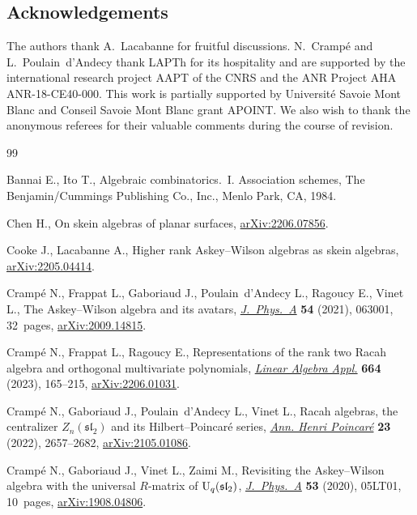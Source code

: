 \documentclass[pdftex]{sigma}
\numberwithin{equation}{section}
\theoremstyle{definition}
\begin{document}
\subsection*{Acknowledgements} The authors thank A.~Lacabanne for fruitful discussions.
N.~Cramp\'e and L.~Poulain~d'Andecy thank LAPTh for its hospitality and are supported by the international research project AAPT of the CNRS and the ANR Project AHA ANR-18-CE40-000.
This work is partially supported by Universit\'e Savoie Mont Blanc and Conseil Savoie Mont Blanc grant APOINT.
We also wish to thank the anonymous referees for their valuable comments during the course of revision.



\begin{thebibliography}{99}
\footnotesize\itemsep=0pt

Bannai E., Ito T., Algebraic combinatorics.~{I}. Association schemes, The
 Benjamin/Cummings Publishing Co., Inc., Menlo Park, CA, 1984.

Chen H., On skein algebras of planar surfaces, \href{https://arxiv.org/abs/2206.07856}{arXiv:2206.07856}.

Cooke J., Lacabanne A., Higher rank {A}skey--{W}ilson algebras as skein
 algebras, \href{https://arxiv.org/abs/2205.04414}{arXiv:2205.04414}.

Cramp\'e N., Frappat L., Gaboriaud J., Poulain~d'Andecy L., Ragoucy E., Vinet L., The
 {A}skey--{W}ilson algebra and its avatars, \href{https://doi.org/10.1088/1751-8121/abd783}{\textit{J.~Phys.~A}} \textbf{54}
 (2021), 063001, 32~pages, \href{https://arxiv.org/abs/2009.14815}{arXiv:2009.14815}.

Cramp\'e N., Frappat L., Ragoucy E., Representations of the rank two {R}acah
 algebra and orthogonal multivariate polynomials, \href{https://doi.org/10.1016/j.laa.2023.01.017}{\textit{Linear Algebra
 Appl.}} \textbf{664} (2023), 165--215, \href{https://arxiv.org/abs/2206.01031}{arXiv:2206.01031}.

Cramp\'e N., Gaboriaud J., Poulain~d'Andecy L., Vinet L., Racah algebras, the
 centralizer {$Z_n(\mathfrak{sl}_2)$} and its {H}ilbert--{P}oincar\'e series,
 \href{https://doi.org/10.1007/s00023-021-01152-y}{\textit{Ann. Henri Poincar\'e}} \textbf{23} (2022), 2657--2682,
 \href{https://arxiv.org/abs/2105.01086}{arXiv:2105.01086}.

Cramp\'e N., Gaboriaud J., Vinet L., Zaimi M., Revisiting the {A}skey--{W}ilson
 algebra with the universal {$R$}-matrix of {${\rm U}_q(\mathfrak{sl}_2)$},
 \href{https://doi.org/10.1088/1751-8121/ab604e}{\textit{J.~Phys.~A}} \textbf{53} (2020), 05LT01, 10~pages,
 \href{https://arxiv.org/abs/1908.04806}{arXiv:1908.04806}.


\end{thebibliography}
\end{document}

